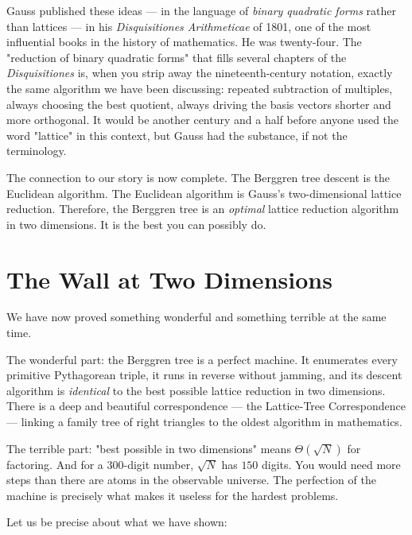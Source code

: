Gauss published these ideas --- in the language of \textit{binary quadratic forms} rather than lattices --- in his \textit{Disquisitiones Arithmeticae} of 1801, one of the most influential books in the history of mathematics. He was twenty-four. The "reduction of binary quadratic forms" that fills several chapters of the \textit{Disquisitiones} is, when you strip away the nineteenth-century notation, exactly the same algorithm we have been discussing: repeated subtraction of multiples, always choosing the best quotient, always driving the basis vectors shorter and more orthogonal. It would be another century and a half before anyone used the word "lattice" in this context, but Gauss had the substance, if not the terminology.

The connection to our story is now complete. The Berggren tree descent is the Euclidean algorithm. The Euclidean algorithm is Gauss's two-dimensional lattice reduction. Therefore, the Berggren tree is an \textit{optimal} lattice reduction algorithm in two dimensions. It is the best you can possibly do.


\bigskip


\section{The Wall at Two Dimensions}

We have now proved something wonderful and something terrible at the same time.

The wonderful part: the Berggren tree is a perfect machine. It enumerates every primitive Pythagorean triple, it runs in reverse without jamming, and its descent algorithm is \textit{identical} to the best possible lattice reduction in two dimensions. There is a deep and beautiful correspondence --- the Lattice-Tree Correspondence --- linking a family tree of right triangles to the oldest algorithm in mathematics.

The terrible part: "best possible in two dimensions" means $\Theta(\sqrt{N})$ for factoring. And for a $300$-digit number, $\sqrt{N}$ has $150$ digits. You would need more steps than there are atoms in the observable universe. The perfection of the machine is precisely what makes it useless for the hardest problems.

Let us be precise about what we have shown:

